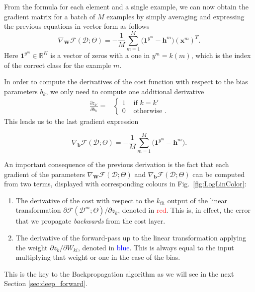 \noindent From the formula for each element and a single example, we can now obtain the gradient matrix for a batch of $M$ examples by simply averaging and expressing the previous equations in vector form as follows
\begin{equation}
\nabla_\mathbf{W}\mathcal{F}(\mathcal{D};\Theta) = -\frac{1}{M}\sum_{m=1}^{M} \Big(\mathrm{\mathbf{1}}^{y^m} - \mathbf{h}^m \Big) \left(\mathbf{x}^m\right)^T.
\label{gradWeigths}
\end{equation}
%
Here $\mathrm{\mathbf{1}}^{y^m} \in \mathbb{R}^{K}$ is a vector of zeros with a one in $y^m=k(m)$, which is
the index of the correct class for the example $m$.

In order to compute the derivatives of the cost function with respect to the
bias parameters $b_{k}$, we only need to compute one additional derivative
\begin{align}
\frac{\partial z_{k'}}{\partial b_{k}} =
  &\begin{cases}
      1  &  \mbox{ if } k = k'\\
      0  &  \mbox{ otherwise }.
  \end{cases}
  \label{eqn:eqsilonq}
\end{align}
%
This leads us to the last gradient expression

\begin{equation}
\nabla_\mathbf{b}\mathcal{F}(\mathcal{D};\Theta) = -\frac{1}{M}\sum_{m=1}^{M} \Big(\mathrm{\mathbf{1}}^{y^m} - \mathbf{h}^m \Big).
\label{eq:gradBias}
\end{equation}

\noindent An important consequence of the previous derivation is the fact that each
gradient of the parameters $\nabla_\mathbf{W}\mathcal{F}(\mathcal{D};\Theta)$ and $\nabla_\mathbf{b}\mathcal{F}(\mathcal{D};\Theta)$ can be computed from two terms, displayed with corresponding colours in Fig.~\ref{fig:LogLinColor}:
%
\begin{enumerate}
        \item The derivative of the cost with respect to the $k_{th}$ output of the linear transformation $\partial \mathcal{F}(\mathcal{D}^m;\Theta)/\partial z_k$, denoted in \textcolor{red}{red}. This is, in effect, the error that we propagate \textit{backwards} from the cost layer.
\item The derivative of the forward-pass up to the linear transformation applying the weight $\partial z_k/\partial W_{ki}$, denoted in \textcolor{blue}{blue}. This is always equal to the input multiplying that weight or one in the case of the bias.
\end{enumerate}
%
\noindent This is the key to the Backpropagation algorithm as we will see in the next Section \ref{sec:deep_forward}.

